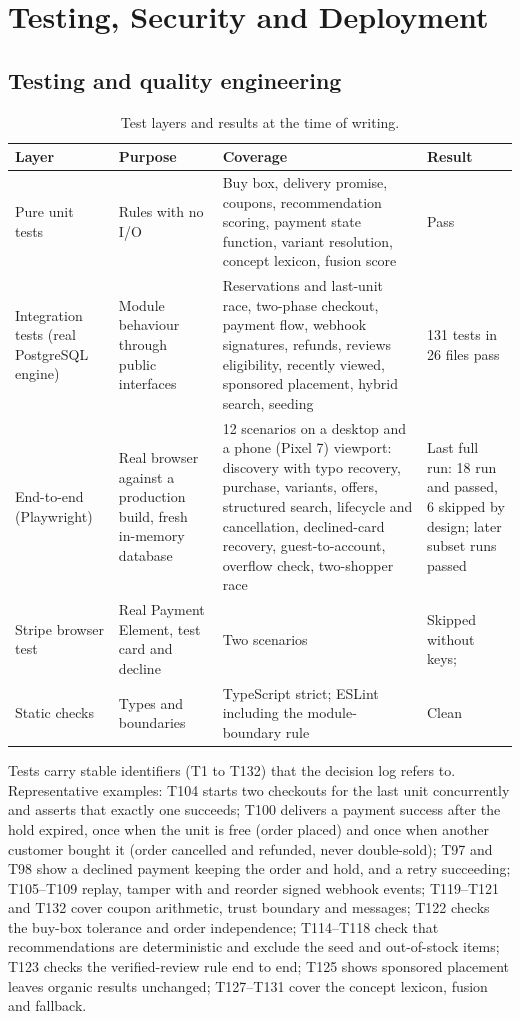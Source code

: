 \chapter{Testing, Security and Deployment}
\label{ch:quality}

\section{Testing and quality engineering}

\begin{table}[H]
\centering
\caption{Test layers and results at the time of writing.}
\label{tab:tests}
\small
\begin{tabularx}{\linewidth}{@{}p{2.6cm}XXp{2.4cm}@{}}
\toprule
Layer & Purpose & Coverage & Result \\
\midrule
Pure unit tests & Rules with no I/O & Buy box, delivery promise, coupons, recommendation scoring, payment state function, variant resolution, concept lexicon, fusion score & Pass \\
Integration tests (real PostgreSQL engine) & Module behaviour through public interfaces & Reservations and last-unit race, two-phase checkout, payment flow, webhook signatures, refunds, reviews eligibility, recently viewed, sponsored placement, hybrid search, seeding & 131 tests in 26 files pass \\
End-to-end (Playwright) & Real browser against a production build, fresh in-memory database & 12 scenarios on a desktop and a phone (Pixel 7) viewport: discovery with typo recovery, purchase, variants, offers, structured search, lifecycle and cancellation, declined-card recovery, guest-to-account, overflow check, two-shopper race & Last full run: 18 run and passed, 6 skipped by design; later subset runs passed \\
Stripe browser test & Real Payment Element, test card and decline & Two scenarios & Skipped without keys; \tagunver{} \\
Static checks & Types and boundaries & TypeScript strict; ESLint including the module-boundary rule & Clean \\
\bottomrule
\end{tabularx}
\end{table}

Tests carry stable identifiers (T1 to T132) that the decision log refers to. Representative examples: T104 starts two checkouts for the last unit concurrently and asserts that exactly one succeeds; T100 delivers a payment success after the hold expired, once when the unit is free (order placed) and once when another customer bought it (order cancelled and refunded, never double-sold); T97 and T98 show a declined payment keeping the order and hold, and a retry succeeding; T105--T109 replay, tamper with and reorder signed webhook events; T119--T121 and T132 cover coupon arithmetic, trust boundary and messages; T122 checks the buy-box tolerance and order independence; T114--T118 check that recommendations are deterministic and exclude the seed and out-of-stock items; T123 checks the verified-review rule end to end; T125 shows sponsored placement leaves organic results unchanged; T127--T131 cover the concept lexicon, fusion and fallback.

